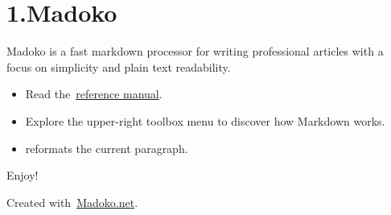 \documentclass{article}
\begin{document}
\mdxtitleblockstart{}
\mdxauthorstart{}
\mdxauthorend\mdtitleauthorrunning{}{}\mdxtitleblockend%

\section{1.\hspace*{0.5em}Madoko}\label{sec-madoko}%

\noindent{}Madoko is a fast markdown processor for writing professional articles
with a focus on simplicity and plain text readability.%

\begin{itemize}[noitemsep,topsep=\mdcompacttopsep]%

\item{}Read the~\href{http://research.microsoft.com/en-us/um/people/daan/madoko/doc/reference.html}{reference manual}.%

\item{}Explore the upper-right toolbox menu to discover how Markdown works.%

\item{} reformats the current paragraph.%
\end{itemize}%

\noindent{}Enjoy!%

\begin{mdbmargintb}{4em}{}%
\begin{mdflushright}%
{\tiny{}Created with~\href{https://www.madoko.net}{Madoko.net}.}%
\end{mdflushright}%
\end{mdbmargintb}%
\end{document}
